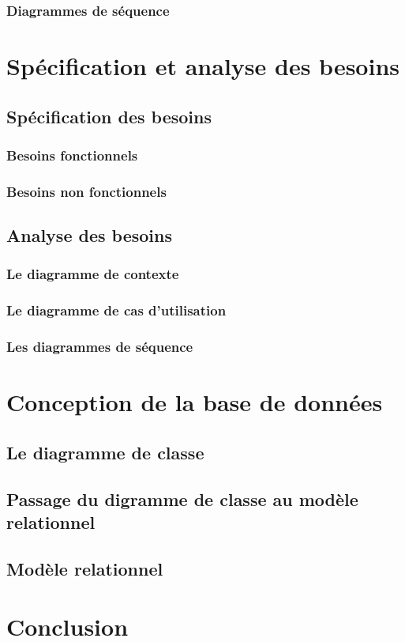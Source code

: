         \subsubsection{Diagrammes de séquence}

\section{Spécification et analyse des besoins}
    \subsection{Spécification des besoins}
        \subsubsection{Besoins fonctionnels}
        \subsubsection{Besoins non fonctionnels}

    \subsection{Analyse des besoins}
        \subsubsection{Le diagramme de contexte}
        \subsubsection{Le diagramme de cas d'utilisation}
        \subsubsection{Les diagrammes de séquence}
        
        
\section{Conception de la base de données}
    \subsection{Le diagramme de classe}
    \subsection{Passage du digramme de classe au modèle relationnel}
    \subsection{Modèle relationnel}

\section{Conclusion}